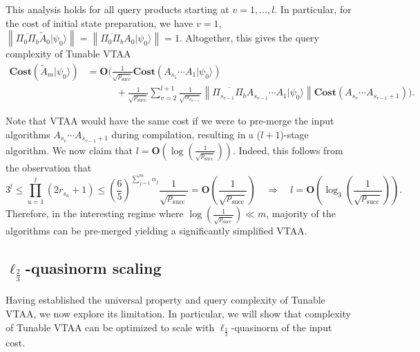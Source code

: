 \documentclass[letterpaper,onecolumn,11pt,accepted=2026-02-14]{quantumarticle}
\newcommand{\norm}[1]{\left\lVert#1\right\rVert}
\theoremstyle{remark}
\theoremstyle{plain}
\newcommand{\ket}[1]{|#1\rangle}
\begin{document}
This analysis holds for all query products starting at $v=1,\ldots,l$. In particular, for the cost of initial state preparation, we have $v=1$, $\norm{\overline{\Pi_0\Pi_b}\widetilde A_0\ket{\psi_0}}=\norm{\overline{\Pi_0\Pi_b}A_0\ket{\psi_0}}=1$.
Altogether, this gives the query complexity of Tunable VTAA
\begin{equation}
\begin{aligned}
    \mathbf{Cost}(\widetilde A_m\ket{\psi_0})
    &=\mathbf{O}\Bigg(\frac{1}{\sqrt{p_{\text{succ}}}}\mathbf{Cost}(A_{s_1}\cdots A_{1}\ket{\psi_0})\\
    &\qquad\quad+\frac{1}{\sqrt{p_{\text{succ}}}}\sum_{v=2}^{l+1}\frac{1}{\sqrt{\alpha_{s_{v-1}}}}
    \norm{\overline{\Pi_{s_{v-1}}\Pi_b}A_{s_{v-1}}\cdots A_1\ket{\psi_0}}\mathbf{Cost}\left(A_{s_v}\cdots A_{s_{v-1}+1}\right)\Bigg).
\end{aligned}
\end{equation}

Note that VTAA would have the same cost if we were to pre-merge the input algorithms $A_{s_v}\cdots A_{s_{v-1}+1}$ during compilation, resulting in a ($l+1$)-stage algorithm. We now claim that $l=\mathbf{O}\left(\log\left(\frac{1}{\sqrt{p_{\text{succ}}}}\right)\right)$. Indeed, this follows from the observation that
\begin{equation}
    3^l
    \leq\prod_{u=1}^{l}(2r_{s_u}+1)
    \leq\left(\frac{6}{5}\right)^{\sum_{j=1}^m\alpha_j}
    \frac{1}{\sqrt{p_{\text{succ}}}}
    =\mathbf{O}\left(\frac{1}{\sqrt{p_{\text{succ}}}}\right)
    \quad\Rightarrow\quad
    l=\mathbf{O}\left(\log_3\left(\frac{1}{\sqrt{p_{\text{succ}}}}\right)\right).
\end{equation}
Therefore, in the interesting regime where $\log\left(\frac{1}{\sqrt{p_{\text{succ}}}}\right)\ll m$, majority of the algorithms can be pre-merged yielding a significantly simplified VTAA.


\subsection{\texorpdfstring{$\ell_{\frac{2}{3}}$}{l2/3}-quasinorm scaling}
\label{sec:tunable_optimal}
Having established the universal property and query complexity of Tunable VTAA, we now explore its limitation. In particular, we will show that complexity of Tunable VTAA can be optimized to scale with $\ell_{\frac{2}{3}}$-quasinorm of the input cost.
\end{document}
